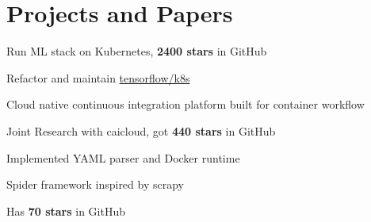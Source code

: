 \documentclass[]{deedy-resume-openfont}
\begin{document}
\begin{minipage}[t]{0.73\textwidth}

\section{Projects and Papers}
\sectionsep

\begin{tightemize}
    \item Run ML stack on Kubernetes, \textbf{2400 stars} in GitHub
    \item Refactor and maintain \href{https://github.com/tensorflow/k8s}{tensorflow/k8s}
    \end{tightemize}
\sectionsep

\begin{tightemize}
    \item Cloud native continuous integration platform built for container workflow
    \item Joint Research with caicloud, got \textbf{440 stars} in GitHub
    \item Implemented YAML parser and Docker runtime
    \end{tightemize}
\sectionsep

\begin{tightemize}
    \item Spider framework inspired by scrapy
    \item Has \textbf{70 stars} in GitHub
    \end{tightemize}
\sectionsep



\end{minipage}
\end{document}
